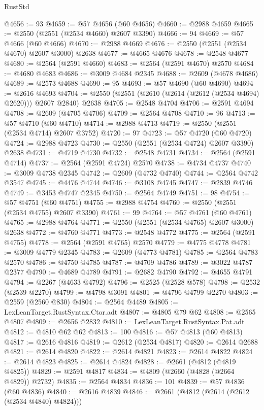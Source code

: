 \begin{lexlean}{RustStd}
\begin{coremodule}
@4656 := 93
@4659 := @57 @4656 (@60 @4656)
@4660 := @2988 @4659
@4665 := @2550 (@2551 (@2534 @4660) @2607 @3390)
@4666 := 94
@4669 := @57 @4666 (@60 @4666)
@4670 := @2988 @4669
@4676 := @2550 (@2551 (@2534 @4670) @2607 @3000) @2638
@4677 := @4665 @4676
@4678 := @2548 @4677
@4680 := @2564 (@2591 @4660)
@4683 := @2564 (@2591 @4670) @2570
@4684 := @4680 @4683
@4686 := @3009 @4684 @2345
@4688 := @2609 (@4678 @4686)
@4689 := @2573 @4688
@4690 := 95
@4693 := @57 @4690 (@60 @4690)
@4694 := @2616 @4693
@4704 := @2550 (@2551 (@2610 (@2614 (@2612 (@2534 @4694) @2620))) @2607 @2840) @2638
@4705 := @2548 @4704
@4706 := @2591 @4694
@4708 := @2609 (@4705 @4706)
@4709 := @2564 @4708
@4710 := 96
@4713 := @57 @4710 (@60 @4710)
@4714 := @2988 @4713
@4719 := @2550 (@2551 (@2534 @4714) @2607 @3752)
@4720 := 97
@4723 := @57 @4720 (@60 @4720)
@4724 := @2988 @4723
@4730 := @2550 (@2551 (@2534 @4724) @2607 @3390) @2638
@4731 := @4719 @4730
@4732 := @2548 @4731
@4734 := @2564 (@2591 @4714)
@4737 := @2564 (@2591 @4724) @2570
@4738 := @4734 @4737
@4740 := @3009 @4738 @2345
@4742 := @2609 (@4732 @4740)
@4744 := @2564 @4742 @3547
@4745 := @4476 @4744
@4746 := @3108 @4745
@4747 := @2839 @4746
@4749 := @3453 @4747 @2345
@4750 := @2564 @4749
@4751 := 98
@4754 := @57 @4751 (@60 @4751)
@4755 := @2988 @4754
@4760 := @2550 (@2551 (@2534 @4755) @2607 @3390)
@4761 := 99
@4764 := @57 @4761 (@60 @4761)
@4765 := @2988 @4764
@4771 := @2550 (@2551 (@2534 @4765) @2607 @3000) @2638
@4772 := @4760 @4771
@4773 := @2548 @4772
@4775 := @2564 (@2591 @4755)
@4778 := @2564 (@2591 @4765) @2570
@4779 := @4775 @4778
@4781 := @3009 @4779 @2345
@4783 := @2609 (@4773 @4781)
@4785 := @2564 @4783 @2570
@4786 := @4750 @4785
@4787 := @4709 @4786
@4789 := @3022 @4787 @2377
@4790 := @4689 @4789
@4791 := @2682 @4790
@4792 := @4655 @4791
@4794 := @2267 (@4633 @4792)
@4796 := @2525 (@2528 @578)
@4798 := @2532 (@2539 @2270)
@4799 := @4798 @3091
@4801 := @4796 @4799 @2270
@4803 := @2559 (@2560 @830)
@4804 := @2564 @4489
@4805 := LexLeanTarget.RustSyntax.Ctor.adt
@4807 := @4805 @79 @62
@4808 := @2565 @4807
@4809 := @2656 @2832
@4810 := LexLeanTarget.RustSyntax.Pat.adt
@4812 := @4810 @62 @62
@4813 := 100
@4816 := @57 @4813 (@60 @4813)
@4817 := @2616 @4816
@4819 := @2612 (@2534 @4817)
@4820 := @2614 @2688
@4821 := @2614 @4820
@4822 := @2614 @4821
@4823 := @2614 @4822
@4824 := @2614 @4823
@4825 := @2614 @4824
@4828 := @2661 (@4812 (@4819 @4825))
@4829 := @2591 @4817
@4834 := @4809 (@2660 (@4828 (@2664 @4829)) @2732)
@4835 := @2564 @4834
@4836 := 101
@4839 := @57 @4836 (@60 @4836)
@4840 := @2616 @4839
@4846 := @2661 (@4812 (@2614 (@2612 (@2534 @4840) @4824)))

\end{coremodule}
\end{lexlean}
